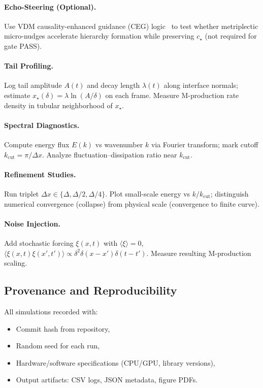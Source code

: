 \documentclass{article}
\begin{document}
\paragraph{Echo-Steering (Optional).}
Use VDM causality-enhanced guidance (CEG) logic~\cite{vdm_ceg} to test whether metriplectic micro-nudges accelerate hierarchy formation while preserving $c_\star$ (not required for gate PASS).

\paragraph{Tail Profiling.}
Log tail amplitude $A(t)$ and decay length $\lambda(t)$ along interface normals; estimate $x_\star(\delta) = \lambda \ln(A/\delta)$ on each frame. Measure M-production rate density in tubular neighborhood of $x_\star$.

\paragraph{Spectral Diagnostics.}
Compute energy flux $E(k)$ vs wavenumber $k$ via Fourier transform; mark cutoff $k_{\text{cut}} = \pi/\Delta x$. Analyze fluctuation--dissipation ratio near $k_{\text{cut}}$.

\paragraph{Refinement Studies.}
Run triplet $\Delta x \in \{\Delta, \Delta/2, \Delta/4\}$. Plot small-scale energy vs $k/k_{\text{cut}}$; distinguish numerical convergence (collapse) from physical scale (convergence to finite curve).

\paragraph{Noise Injection.}
Add stochastic forcing $\xi(x,t)$ with $\langle \xi \rangle = 0$, $\langle \xi(x,t) \xi(x',t') \rangle \propto \delta^2 \delta(x-x') \delta(t-t')$. Measure resulting M-production scaling.

\subsection*{Provenance and Reproducibility}

All simulations recorded with:
\begin{itemize}[noitemsep]
\item Commit hash from repository,
\item Random seed for each run,
\item Hardware/software specifications (CPU/GPU, library versions),
\item Output artifacts: CSV logs, JSON metadata, figure PDFs.
\end{itemize}
\end{document}

